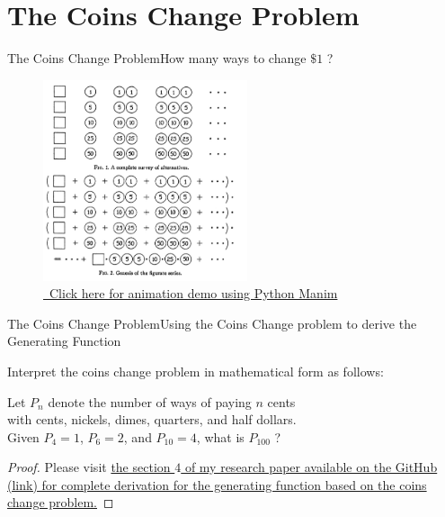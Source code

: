 \documentclass{beamer}
\begin{document}
    \section{The Coins Change Problem}
    \begin{frame}{The Coins Change Problem}{How many ways to change $\$1$ ?}
        \begin{figure}[h!]
        \centering
            \includegraphics[width=6cm]{images/coins-change.jpg}
            \caption{\href{https://youtu.be/PmR1eRswj3A}{\small\ Click here for animation demo using Python Manim}}
        \end{figure}
    \end{frame}

    \begin{frame}{The Coins Change Problem}{Using the Coins Change problem to derive the Generating Function}
        \begin{definition}
            Interpret the coins change problem in mathematical form as follows:
            \begin{center}{Let \( P_n \) denote the number of ways of paying \(n\) cents \\ with cents, nickels, dimes, quarters, and half dollars.\\ Given \(P_4=1\), \(P_6=2\), and \(P_{10}=4\), what is \(P_{100}\) ?}
            \end{center}
        \end{definition}
        \begin{proof}
            Please visit \href {https://github.com/ethan201not404/Math-Mentorship-2024/blob/main/2024MathMentorshipByEthanLi.pdf}{the section $4$ of my research paper available on the GitHub (link) for complete derivation for the generating function based on the coins change problem.}
        \end{proof}
    \end{frame}
\end{document}
